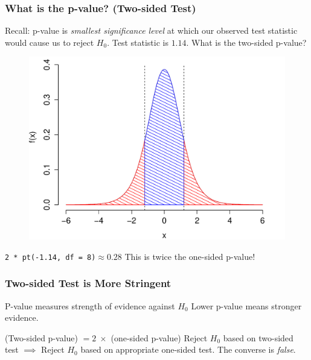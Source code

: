 \documentclass[handout]{beamer}
\begin{document}
\begin{frame}
\frametitle{What is the p-value? (Two-sided Test)}
\footnotesize
Recall: p-value is \emph{smallest significance level} at which our observed test statistic would cause us to reject $H_0$. \alert{Test statistic is $1.14$. What is the two-sided p-value? }
\begin{figure}
\includegraphics[scale= 0.4]{./images/p_both5}
\end{figure}

\texttt{2 * pt(-1.14, df = 8)}$\approx 0.28$ \pause \hfill \alert{This is twice the one-sided p-value!}
\end{frame}


\begin{frame}
\frametitle{Two-sided Test is More Stringent}
\begin{block}{P-value measures strength of evidence against $H_0$}
Lower p-value means stronger evidence. 
\end{block}

\begin{block}{(Two-sided p-value) $= 2 \; \times$  (one-sided p-value)}
Reject $H_0$ based on two-sided test $\implies$ Reject $H_0$ based on appropriate one-sided test. The converse is \emph{false}.
\end{block}


\end{frame}
\end{document}

